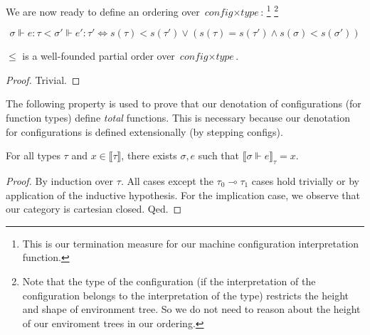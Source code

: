 \begin{definition}[Orderings]
  We are now ready to define an ordering over $\textit{config} \times
  \textit{type}$:
  \footnote{This is our termination measure for our machine configuration
  interpretation function.}
  \footnote{Note that the type of the configuration (if the interpretation of
  the configuration belongs to the interpretation of the type) restricts the
  height and shape of environment tree. So we do not need to reason about the
  height of our enviroment trees in our ordering.}

  \begin{equation}
    \sigma \Vdash e : \tau < \sigma' \Vdash e' : \tau' \iff
    s(\tau) < s(\tau') \lor (s(\tau) = s(\tau') \land s(\sigma) < s(\sigma'))
  \end{equation}

\end{definition}

\begin{lemma}
  $\leq$ is a well-founded partial order over $\textit{config} \times
  \textit{type}$.
\end{lemma}
\begin{proof}
  Trivial.
\end{proof}


The following property is used to prove that our denotation of configurations
(for function types) define \textit{total} functions. This is necessary because
our denotation for configurations is defined extensionally (by stepping
configs).

\begin{lemma}
  For all types $\tau$ and $x \in \llbracket \tau \rrbracket$, there exists
  $\sigma, e$ such that $\llbracket \sigma \Vdash e \rrbracket_{\tau} = x$.
\end{lemma}
\begin{proof}
  By induction over $\tau$. All cases except the $\tau_0 \multimap \tau_1$ cases
  hold trivially or by application of the inductive hypothesis. For the
  implication case, we observe that our category is cartesian closed. Qed.
\end{proof}

